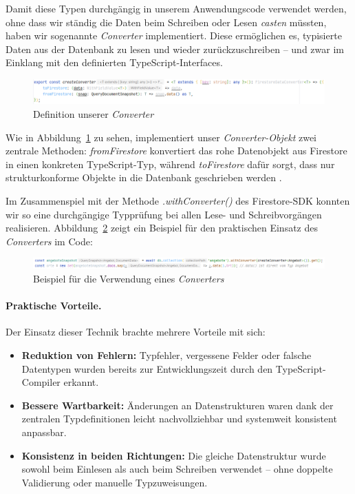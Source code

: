\documentclass[12pt,a4paper%
              ,oneside     %
              ,titlepage
              ,DIV=13
              ,headinclude
              ,footinclude=false%
              ,cleardoublepage=empty%
              ,parskip=half,
              BCOR=0mm,
              ]{scrreprt}
\begin{document}
Damit diese Typen durchgängig in unserem Anwendungscode verwendet werden, ohne dass wir ständig die Daten beim Schreiben oder Lesen \textit{casten} müssten, haben wir sogenannte \textit{Converter} implementiert. Diese ermöglichen es, typisierte Daten aus der Datenbank zu lesen und wieder zurückzuschreiben – und zwar im Einklang mit den definierten TypeScript-Interfaces.

\begin{figure}[H]
	\centering
	\includegraphics[width=\linewidth]{img/converter.png}
	\caption{Definition unserer \textit{Converter}}
	\label{fig:converter}
\end{figure}

Wie in Abbildung~\ref{fig:converter} zu sehen, implementiert unser \textit{Converter-Objekt} zwei zentrale Methoden: \textit{fromFirestore} konvertiert das rohe Datenobjekt aus Firestore in einen konkreten TypeScript-Typ, während \textit{toFirestore} dafür sorgt, dass nur strukturkonforme Objekte in die Datenbank geschrieben werden \cite{FirebaseConverter.2022}. 

Im Zusammenspiel mit der Methode \textit{.withConverter()} des Firestore-SDK konnten wir so eine durchgängige Typprüfung bei allen Lese- und Schreibvorgängen realisieren. Abbildung~\ref{fig:converter_example} zeigt ein Beispiel für den praktischen Einsatz des \textit{Converters} im Code:

\begin{figure}[H]
	\centering
	\includegraphics[width=\linewidth]{img/converter_example.png}
	\caption{Beispiel für die Verwendung eines \textit{Converters}}
	\label{fig:converter_example}
\end{figure}

\paragraph{\textbf{Praktische Vorteile.}} Der Einsatz dieser Technik brachte mehrere Vorteile mit sich:

\begin{itemize}
	\item \textbf{Reduktion von Fehlern:} Typfehler, vergessene Felder oder falsche Datentypen wurden bereits zur Entwicklungszeit durch den TypeScript-Compiler erkannt.
	\item \textbf{Bessere Wartbarkeit:} Änderungen an Datenstrukturen waren dank der zentralen Typdefinitionen leicht nachvollziehbar und systemweit konsistent anpassbar.
	\item \textbf{Konsistenz in beiden Richtungen:} Die gleiche Datenstruktur wurde sowohl beim Einlesen als auch beim Schreiben verwendet – ohne doppelte Validierung oder manuelle Typzuweisungen.
\end{itemize}
\end{document}
